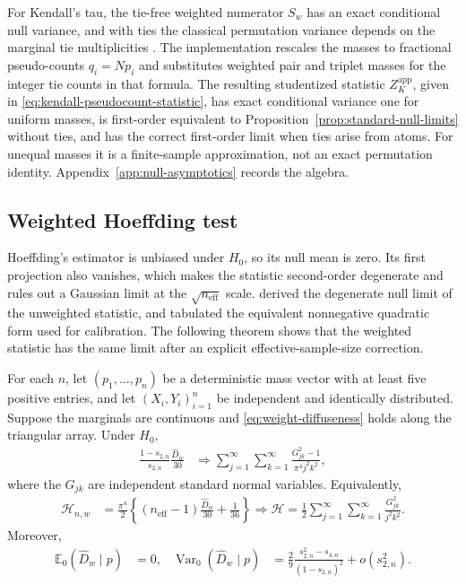 For Kendall's tau, the tie-free weighted numerator $S_w$ has an exact
conditional null variance, and with ties the classical permutation variance
depends on the marginal tie multiplicities \citep{kendall1945,kendall1947}.
The implementation rescales the masses to fractional pseudo-counts $q_i=Np_i$
and substitutes weighted pair and triplet masses for the integer tie counts in
that formula. The resulting studentized statistic $Z_K^{\mathrm{app}}$, given
in \eqref{eq:kendall-pseudocount-statistic}, has exact conditional variance
one for uniform masses, is first-order equivalent to
Proposition~\ref{prop:standard-null-limits} without ties, and has the correct
first-order limit when ties arise from atoms. For unequal masses it is a
finite-sample approximation, not an exact permutation identity.
Appendix~\ref{app:null-asymptotics} records the algebra.

\subsection{Weighted Hoeffding test}
\label{subsec:hoeffding-test}

Hoeffding's estimator is unbiased under $H_0$, so its null mean is zero. Its
first projection also vanishes, which makes the statistic second-order
degenerate and rules out a Gaussian limit at the $\sqrt{n_{\mathrm{eff}}}$
scale. \citet{hoeffding1948} derived the degenerate null limit of the
unweighted statistic, and \citet{blum1961} tabulated the equivalent
nonnegative quadratic form used for calibration. The following theorem shows
that the weighted statistic has the same limit after an explicit
effective-sample-size correction.

\begin{theorem}
\label{thm:weighted-hoeffding-null}
For each $n$, let $(p_1,\ldots,p_n)$ be a deterministic mass vector with at
least five positive entries, and let $(X_i,Y_i)_{i=1}^n$ be independent and
identically distributed. Suppose the marginals are continuous and
\eqref{eq:weight-diffuseness} holds along the triangular array. Under $H_0$,
\begin{align}
  \frac{1-s_{2,n}}{s_{2,n}}\frac{\widehat D_w}{30}
  &\mathrel{\Longrightarrow}
  \sum_{j=1}^{\infty}\sum_{k=1}^{\infty}
  \frac{G_{jk}^2-1}{\pi^4j^2k^2},
  \label{eq:hoeffding-centered-limit}
\end{align}
where the $G_{jk}$ are independent standard normal variables. Equivalently,
\begin{align}
  \mathcal H_{n,w}
  &= \frac{\pi^4}{2}
     \left\{
       (n_{\mathrm{eff}}-1)\frac{\widehat D_w}{30}
       +\frac{1}{36}
     \right\}
  \mathrel{\Longrightarrow}
  \mathcal H
  = \frac12\sum_{j=1}^{\infty}\sum_{k=1}^{\infty}
    \frac{G_{jk}^2}{j^2k^2}.
  \label{eq:hoeffding-positive-limit}
\end{align}
Moreover,
\begin{align*}
  \mathbb{E}_0(\widehat D_w\mid p)
  &=0,
  &
  \operatorname{Var}_0(\widehat D_w\mid p)
  &= \frac{2}{9}
     \frac{s_{2,n}^2-s_{4,n}}{(1-s_{2,n})^2}
     +o(s_{2,n}^2).
\end{align*}
\end{theorem}

